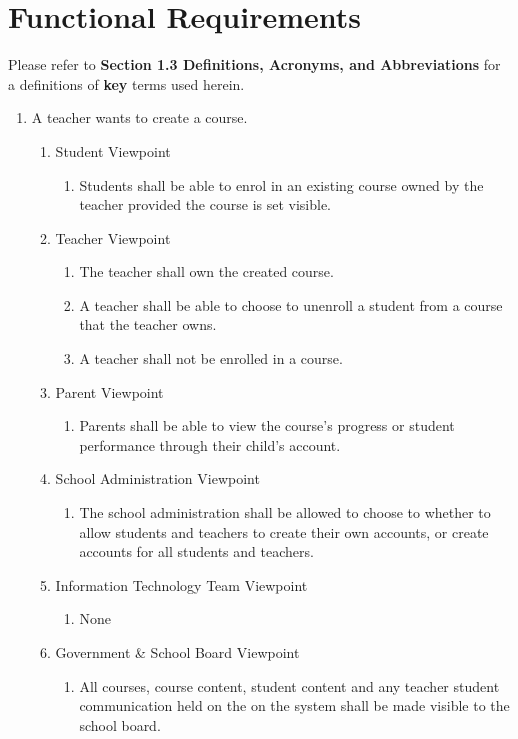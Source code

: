\documentclass[]{article}
\begin{document}

\section{Functional Requirements}
\label{sec:functional_requirements}

Please refer to \textbf{Section 1.3 Definitions, Acronyms, and Abbreviations}
for a definitions of \textbf{key} terms used herein.


\begin{enumerate}[{BE}1.]
	\item A teacher wants to create a course.
	\begin{enumerate}[{VP1}.1]
		\item Student Viewpoint
			\begin{enumerate}
				\item Students shall be able to enrol in an existing course owned by the
teacher provided the course is set visible.
			\end{enumerate}
		\item Teacher Viewpoint
			\begin{enumerate}
			    \item The teacher shall own the created course.
				\item A teacher shall be able to choose to unenroll a student from a course
that the teacher owns.
				\item A teacher shall not be enrolled in a course.
			\end{enumerate}
		\item Parent Viewpoint
			\begin{enumerate}
				\item Parents shall be able to view the course's progress or student
performance through their child's account.
			\end{enumerate}
		\item School Administration Viewpoint
			\begin{enumerate}
				\item The school administration shall be allowed to choose to whether to
allow students and teachers
to create their own accounts, or create accounts for all students and teachers.
			\end{enumerate}
		\item Information Technology Team Viewpoint
			\begin{enumerate}
				\item None
			\end{enumerate}
		\item Government \& School Board Viewpoint
			\begin{enumerate}
				\item All courses, course content, student content and any teacher student
communication held on the on the system shall be made visible to the school
board.
			\end{enumerate}
	\end{enumerate}


\end{enumerate}
\end{document}
